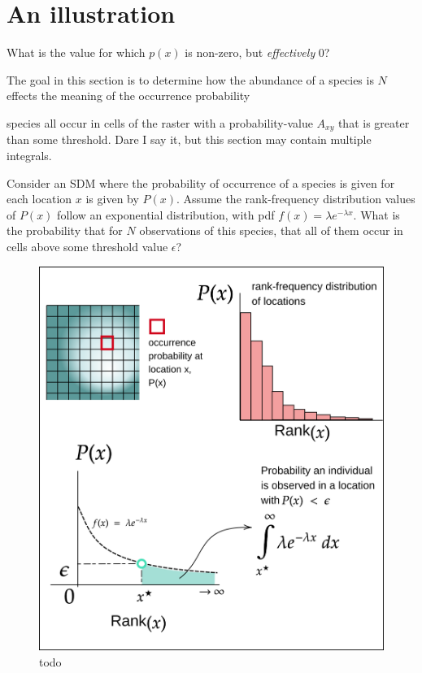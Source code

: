 \documentclass[10pt,oneside]{article}
\makeatletter
\def\maxwidth{\ifdim\Gin@nat@width>\linewidth\linewidth
\else\Gin@nat@width\fi}
\let\Oldincludegraphics\includegraphics
\renewcommand{\includegraphics}[1]{\Oldincludegraphics[width=\maxwidth]{#1}}
\makeatother
\begin{document}
\hypertarget{an-illustration}{%
\section{An illustration}\label{an-illustration}}

What is the value for which \(p(x)\) is non-zero, but \emph{effectively}
\(0\)?

The goal in this section is to determine how the abundance of a species
is \(N\) effects the meaning of the occurrence probability

species all occur in cells of the raster with a probability-value
\(A_{xy}\) that is greater than some threshold. Dare I say it, but this
section may contain multiple integrals.

Consider an SDM where the probability of occurrence of a species is
given for each location \(x\) is given by \(P(x)\). Assume the
rank-frequency distribution values of \(P(x)\) follow an exponential
distribution, with pdf \(f(x) = \lambda e^{-\lambda x}\). What is the
probability that for \(N\) observations of this species, that all of
them occur in cells above some threshold value \(\epsilon\)?

\begin{figure}
\hypertarget{fig:density}{%
\centering
\includegraphics{./figures/probdensity.png}
\caption{todo}\label{fig:density}
}
\end{figure}
\end{document}
